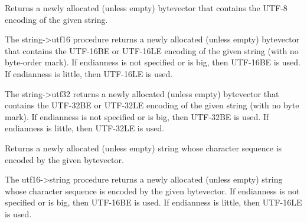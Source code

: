 \begin{entry}{%
}

Returns a newly allocated (unless empty) bytevector that
contains the UTF-8 encoding of the given string.
\end{entry}

\begin{entry}{%
}

  The {\cf string->utf16
  procedure} returns a newly allocated (unless empty) bytevector that
contains the UTF-16BE or UTF-16LE encoding of the given string (with
no byte-order mark).  If endianness is not specified or is {\cf big},
then UTF-16BE is used.  If endianness is {\cf little}, then UTF-16LE
is used.
\end{entry}

\begin{entry}{%
}

  The {\cf string->utf32} returns
a newly allocated (unless empty) bytevector that contains the UTF-32BE
or UTF-32LE encoding of the given string (with no byte mark).  If
endianness is not specified or is {\cf big}, then UTF-32BE is used.
If endianness is {\cf little}, then UTF-32LE is used.
\end{entry}

\begin{entry}{%
}

Returns a newly allocated (unless empty) string whose character
sequence is encoded by the given bytevector.
\end{entry}

\begin{entry}{%
}

  The {\cf utf16->string}
procedure returns a newly allocated (unless empty) string whose
character sequence is encoded by the given bytevector.
If endianness is not specified or is {\cf big},
then UTF-16BE is used.  If endianness is {\cf little}, then UTF-16LE
is used.
\end{entry}

